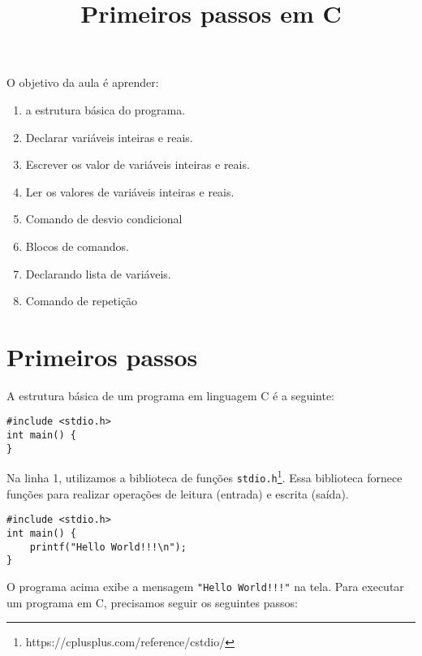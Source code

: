 \documentclass[a4paper,11pt]{article}
\begin{document}
\title{Primeiros passos em C}
\date{}
\maketitle

\normalsize

\noindent

O objetivo da aula é aprender: 
\begin{enumerate}
    \item a estrutura básica do programa.
    \item Declarar variáveis inteiras e reais.
    \item Escrever os valor de variáveis inteiras e reais.
    \item Ler os valores de variáveis inteiras e reais.
    \item Comando de desvio condicional
    \item Blocos de comandos.
    \item Declarando lista de variáveis.
    \item Comando de repetição
\end{enumerate}

\newpage


\section{Primeiros passos}



A estrutura básica de um programa em linguagem C é a seguinte:

\begin{verbatim}
#include <stdio.h>
int main() {
}
\end{verbatim}

Na linha 1, utilizamos a biblioteca de funções \texttt{stdio.h}\footnote{https://cplusplus.com/reference/cstdio/}. Essa biblioteca fornece funções para realizar operações de leitura (entrada) e escrita (saída).

\begin{verbatim}
#include <stdio.h>
int main() {
    printf("Hello World!!!\n");
}
\end{verbatim}

O programa acima exibe a mensagem \texttt{"Hello World!!!"} na tela. Para executar um programa em C, precisamos seguir os seguintes passos:
\end{document}
